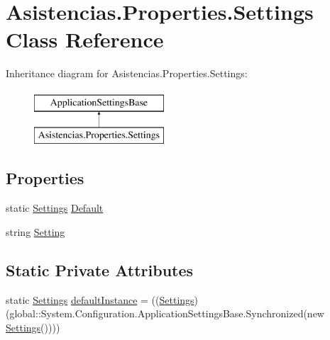 \hypertarget{class_asistencias_1_1_properties_1_1_settings}{\section{Asistencias.\-Properties.\-Settings Class Reference}
\label{class_asistencias_1_1_properties_1_1_settings}
}
Inheritance diagram for Asistencias.\-Properties.\-Settings\-:\begin{figure}[H]
\begin{center}
\leavevmode
\includegraphics[height=2.000000cm]{dd/dde/class_asistencias_1_1_properties_1_1_settings}
\end{center}
\end{figure}
\subsection*{Properties}
\begin{DoxyCompactItemize}
\item 
static \hyperlink{class_asistencias_1_1_properties_1_1_settings}{Settings} \hyperlink{class_asistencias_1_1_properties_1_1_settings_ae0b0610cb4d0649f9574754f47dfe4b0}{Default}
\item 
string \hyperlink{class_asistencias_1_1_properties_1_1_settings_aade5c3d45e89053882a73b3d940ec9dd}{Setting}
\end{DoxyCompactItemize}
\subsection*{Static Private Attributes}
\begin{DoxyCompactItemize}
\item 
static \hyperlink{class_asistencias_1_1_properties_1_1_settings}{Settings} \hyperlink{class_asistencias_1_1_properties_1_1_settings_a541faf49d98f3ced3a7892c27109780b}{default\-Instance} = ((\hyperlink{class_asistencias_1_1_properties_1_1_settings}{Settings})(global\-::\-System.\-Configuration.\-Application\-Settings\-Base.\-Synchronized(new \hyperlink{class_asistencias_1_1_properties_1_1_settings}{Settings}())))
\end{DoxyCompactItemize}



